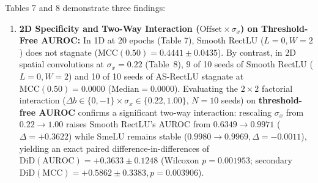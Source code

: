 \documentclass[11pt, a4paper]{article}
\begin{document}
Tables 7 and 8 demonstrate three findings:
\begin{enumerate}
    \item \textbf{2D Specificity and Two-Way Interaction ($\text{Offset} \times \sigma_{x}$) on Threshold-Free AUROC:} In 1D at 20 epochs (Table 7), Smooth RectLU ($L=0, W=2$) does not stagnate ($\text{MCC}(0.50) = 0.4441 \pm 0.0435$). By contrast, in 2D spatial convolutions at $\sigma_{x}=0.22$ (Table~8), 9 of 10 seeds of Smooth RectLU ($L=0, W=2$) and 10 of 10 seeds of AS-RectLU stagnate at $\text{MCC}(0.50) = 0.0000$ ($\text{Median} = 0.0000$). Evaluating the $2 \times 2$ factorial interaction ($\Delta b \in \{0, -1\} \times \sigma_{x} \in \{0.22, 1.00\}$, $N=10$ seeds) on \textbf{threshold-free AUROC} confirms a significant two-way interaction: rescaling $\sigma_{x}$ from $0.22 \to 1.00$ raises Smooth RectLU's AUROC from $0.6349 \to 0.9971$ ($\Delta = +0.3622$) while SmeLU remains stable ($0.9980 \to 0.9969, \Delta = -0.0011$), yielding an exact paired difference-in-differences of $\text{DiD}(\text{AUROC}) = +0.3633 \pm 0.1248$ (Wilcoxon $p = 0.001953$; secondary $\text{DiD}(\text{MCC}) = +0.5862 \pm 0.3383, p = 0.003906$).

\end{enumerate}
\end{document}
